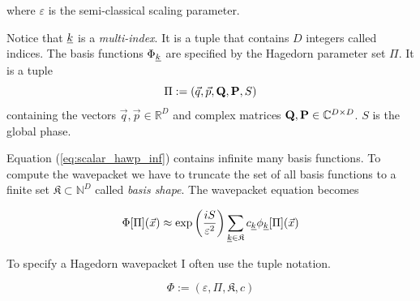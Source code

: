 \documentclass{article}
\begin{document}
where \(\varepsilon\) is the semi-classical scaling parameter.\par
Notice that \(\underline{k}\) is a \emph{multi-index}. It is a tuple that
contains \(D\) integers called indices.
The basis functions \(\Phi_{\underline{k}}\) are specified by the
Hagedorn parameter set \(\Pi\). It is a tuple
\[
  \Pi := \left(\vec{q},\vec{p},\mathbf{Q},\mathbf{P},S\right)
\]
containing the vectors \( \vec{q},\vec{p} \in \mathbb{R}^D \) and
complex matrices \( \mathbf{Q},\mathbf{P} \in \mathbb{C}^{D \times D} \). \(S\) is
the global phase.

Equation (\ref{eq:scalar_hawp_inf}) contains infinite many basis functions.
To compute the wavepacket we have to truncate the set of all basis functions to
a finite set \(\mathfrak{K} \subset \mathbb{N}^D\) called \emph{basis shape}.
The wavepacket equation becomes

\[
  \Phi[\Pi](\vec{x}) \approx \exp{\left(\frac{iS}{\varepsilon^2}\right)} 
  \sum_{\underline{k} \in \mathfrak{K}}c_{\underline{k}}\phi_{\underline{k}}[\Pi](\vec{x})
\]

To specify a Hagedorn wavepacket I often use the tuple notation.

\[
  \Phi := \left(\varepsilon,\Pi,\mathfrak{K},c\right)
\]
\end{document}
